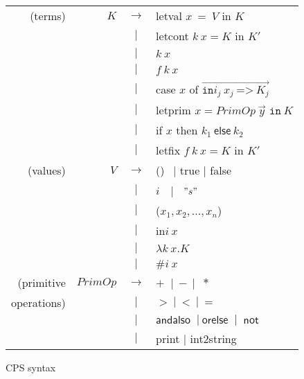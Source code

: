 \documentclass{article}
\theoremstyle{definition}
\theoremstyle{remark}
\numberwithin{equation}{section}
\begin{document}
\begin{figure}[!ht]
  \centering
\begin{tabular}{rrcl}
(terms) & $K$ & $\to$ & \textsf{letval }$x\ =\ V$ \textsf{ in } $K$ \\
        &     & $|$ & \textsf{letcont }$k\ x = K$\textsf{ in }$K'$\\
        &     & $|$ &  $k\ x$ \\
        &     & $|$ & $f\ k\ x$ \\
        &     & $|$ & \textsf{case} $x$ \textsf{of}
            $\overrightarrow{\texttt{in}i_j\ x_j\ \texttt{=>}\ K_j}$\\
        &     & $|$ & \textsf{letprim} $x=PrimOp\ \vec{y}
         \texttt{ in}\ K$\\
        &     & $|$ &\textsf{if} $x$ \textsf{then} $k_1\ \textsf{else}\ k_2$\\
        &     & $|$ &\textsf{letfix }$f\ k\ x=K$\textsf{ in }$K'$\\

(values) & $V$ & $\to$ & () $\ \ |$ \textsf{ true } $|$ \textsf{ false}\\
        &     & $|$ & $i\ \ $ $\ |\ $  $\ "s"$\\
        &     & $|$ & ($x_1,x_2, ..., x_n$)\\
        &     & $|$ & \textsf{in}$i\ x$\\
        &     & $|$ &  $\lambda k\ x.K$ \\
        &     & $|$ &  $\texttt{\#}i\ x$ \\

(primitive & $PrimOp$ & $\to$ & $+\ $ $|\ -\ |$ $\ *$\\
operations) &     & $|$ & $>\ |\ <\ |\ =$\\
        &     & $|$ & $\textsf{andalso }\ |\ \textsf{orelse }\ |\ \textsf{ not}$\\
        &     & $|$ & \textsf{print} $|$ \textsf{int2string}\\
\end{tabular}
  \caption{CPS syntax}
  \label{fig-sub}
\end{figure}



\end{document}
